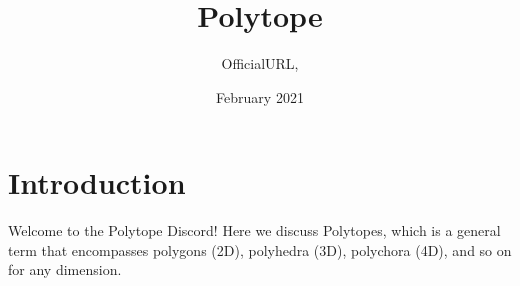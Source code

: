 \documentclass{article}
\title{Polytope}
\author{OfficialURL, }
\date{February 2021}
\begin{document}
\maketitle

\section{Introduction}
Welcome to the Polytope Discord! Here we discuss Polytopes, which is a general term that encompasses polygons (2D), polyhedra (3D), polychora (4D), and so on for any dimension.
\end{document}
